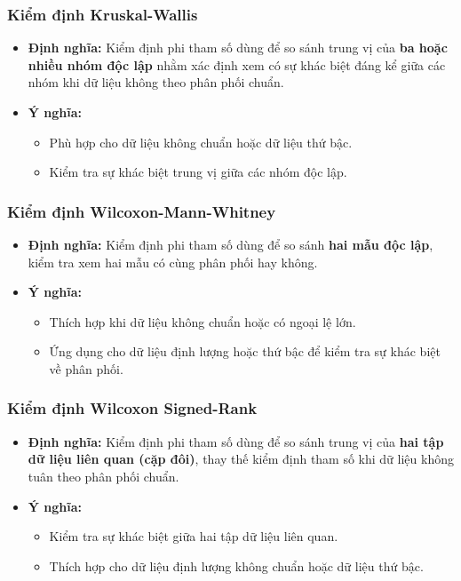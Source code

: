 \subsubsection{Kiểm định Kruskal-Wallis}  
\begin{itemize}
    \item \textbf{Định nghĩa:} Kiểm định phi tham số dùng để so sánh trung vị của \textbf{ba hoặc nhiều nhóm độc lập} nhằm xác định xem có sự khác biệt đáng kể giữa các nhóm khi dữ liệu không theo phân phối chuẩn.  
    \item \textbf{Ý nghĩa:}  
    \begin{itemize}
        \item Phù hợp cho dữ liệu không chuẩn hoặc dữ liệu thứ bậc.  
        \item Kiểm tra sự khác biệt trung vị giữa các nhóm độc lập.  
    \end{itemize}
\end{itemize}

\subsubsection{Kiểm định Wilcoxon-Mann-Whitney}  
\begin{itemize}
    \item \textbf{Định nghĩa:} Kiểm định phi tham số dùng để so sánh \textbf{hai mẫu độc lập}, kiểm tra xem hai mẫu có cùng phân phối hay không.  
    \item \textbf{Ý nghĩa:}  
    \begin{itemize}
        \item Thích hợp khi dữ liệu không chuẩn hoặc có ngoại lệ lớn.  
        \item Ứng dụng cho dữ liệu định lượng hoặc thứ bậc để kiểm tra sự khác biệt về phân phối.  
    \end{itemize}
\end{itemize}

\subsubsection{Kiểm định Wilcoxon Signed-Rank}  
\begin{itemize}
    \item \textbf{Định nghĩa:} Kiểm định phi tham số dùng để so sánh trung vị của \textbf{hai tập dữ liệu liên quan (cặp đôi)}, thay thế kiểm định tham số khi dữ liệu không tuân theo phân phối chuẩn.  
    \item \textbf{Ý nghĩa:}  
    \begin{itemize}
        \item Kiểm tra sự khác biệt giữa hai tập dữ liệu liên quan.  
        \item Thích hợp cho dữ liệu định lượng không chuẩn hoặc dữ liệu thứ bậc.  
    \end{itemize}
\end{itemize}

